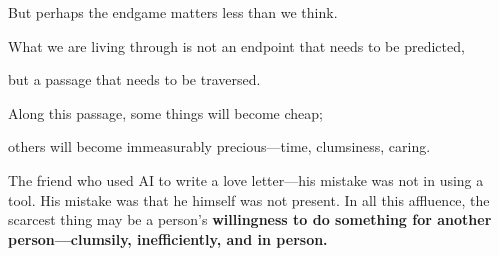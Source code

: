 





\vspace{1em}




But perhaps the endgame matters less than we think.

What we are living through is not an endpoint that needs to be predicted,

but a passage that needs to be traversed.

Along this passage, some things will become cheap;

others will become immeasurably precious---time, clumsiness, caring.

\vspace{1em}

The friend who used AI to write a love letter---his mistake was not in using a tool. His mistake was that he himself was not present.
In all this affluence, the scarcest thing may be a person's \textbf{willingness to do something for another person---clumsily, inefficiently, and in person.}
